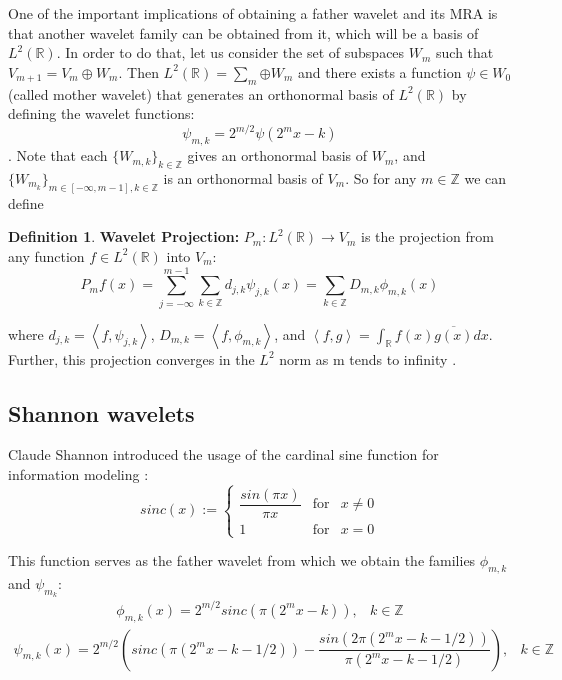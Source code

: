 \documentclass[12,twoside]{mammeTFM}
\theoremstyle{definition}
\newtheorem{definition}[thm]{Definition}
\theoremstyle{remark}
\newcommand{\Z}{\ensuremath{\mathbb{Z}}}
\newcommand{\R}{\ensuremath{\mathbb{R}}}
\begin{document}
One of the important implications of obtaining a father wavelet and its MRA is that another wavelet family can be obtained from it, which will be a basis of $L^2(\R)$. In order to do that, let us consider the set of subspaces $W_m$ such that $V_{m+1} = V_m \oplus W_m$. Then $L^2(\R) = \sum_m{\oplus W_m}$ and there exists a function $\psi \in W_0$ (called mother wavelet) that generates an orthonormal basis of $L^2(\R)$ \cite{dau92} by defining the wavelet functions:
$$ \psi_{m, k} = 2^{m/2}\psi(2^m x - k)$$
. Note that each $\{W_{m,k}\}_{k \in \Z}$ gives an orthonormal basis of $W_m$, and $\{W_{m_k}\}_{m\in [-\infty, m-1], k \in \Z}$ is an orthonormal basis of $V_m$. So for any $m \in \Z$ we can define 
\begin{definition} \label{def:wavelet_projection}
\textbf{Wavelet Projection:} $P_m: L^2(\R) \rightarrow V_m$ is the projection from any function $f \in L^2(\R)$ into $V_m$:
\begin{equation} 
P_m f(x) = \sum_{j = -\infty}^{m-1} \sum_{k \in \Z} d_{j,k} \psi_{j, k}(x) = \sum_{k \in \Z} D_{m,k} \phi_{m, k}(x)
\end{equation}

where $d_{j, k} = \left\langle f,\psi_{j, k}\right\rangle$, $D_{m,k} = \left\langle f,\phi_{m, k}\right\rangle$, and $\left\langle f,g\right\rangle = \int_\R f(x) \overline{g(x)} dx$. Further, this projection converges in the $L^2$ norm as m tends to infinity \cite{tour}.
\end{definition}

\subsection{Shannon wavelets}
Claude Shannon introduced the usage of the cardinal sine function for information modeling \cite{sha49}:
\begin{equation}
sinc(x) := \left\{ \begin{array}{rcl} \dfrac{sin(\pi x)}{\pi x} & \mbox{for} & x \neq 0 \\ 1 & \mbox{for} & x = 0 \end{array}\right.
\end{equation}

This function serves as the father wavelet from which we obtain the families $\phi_{m, k}$ and $\psi_{m_k}$:
\begin{equation}
\begin{array}{rcl}
\label{eq:wavelet}
\phi_{m,k}(x) = 2^{m/2} sinc(\pi (2^m x - k)), & k \in \Z
\end{array}
\end{equation}
\begin{equation}
\begin{array}{rcl}
\psi_{m,k}(x) = 2^{m/2} \left( sinc(\pi (2^m x - k - 1/2)) - \dfrac{sin(2 \pi (2^m x - k - 1/2))}{\pi (2^m x - k - 1/2)} \right), & k \in \Z
\end{array}
\end{equation}
\end{document}
